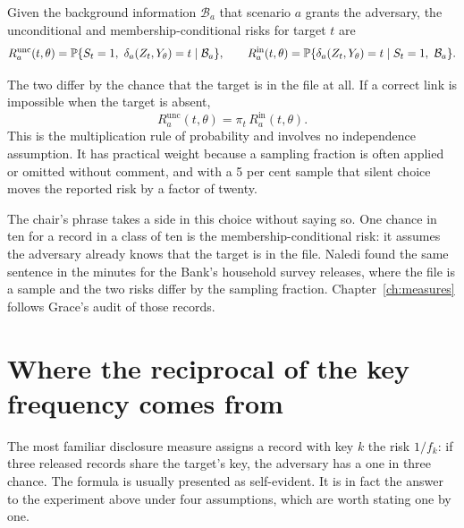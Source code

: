 \begin{definition}\label{def:risk}
Given the background information $\mathcal{B}_a$ that scenario $a$ grants the
adversary, the unconditional and membership-conditional risks for target $t$ are
\begin{equation}\label{eq:tworisks}
R^{\mathrm{unc}}_a(t,\theta) = \mathbb{P}\{S_t = 1,\ \delta_a(Z_t,Y_\theta) = t \mid \mathcal{B}_a\},
\qquad
R^{\mathrm{in}}_a(t,\theta) = \mathbb{P}\{\delta_a(Z_t,Y_\theta) = t \mid S_t = 1,\ \mathcal{B}_a\}.
\end{equation}
\end{definition}

The two differ by the chance that the target is in the file at all. If a correct
link is impossible when the target is absent,
\begin{equation}\label{eq:factor}
R^{\mathrm{unc}}_a(t,\theta) = \pi_t\, R^{\mathrm{in}}_a(t,\theta).
\end{equation}
This is the multiplication rule of probability and involves no independence
assumption. It has practical weight because a sampling fraction is often applied
or omitted without comment, and with a 5 per cent sample that silent choice moves
the reported risk by a factor of twenty.

The chair's phrase takes a side in this choice without saying so. One chance in ten for a record in a class of ten is the membership-conditional risk: it assumes the adversary already knows that the target is in the file. Naledi found the same sentence in the minutes for the Bank's household survey releases, where the file is a sample and the two risks differ by the sampling fraction. Chapter~\ref{ch:measures} follows Grace's audit of those records.

\section{Where the reciprocal of the key frequency comes from}

The most familiar disclosure measure assigns a record with key $k$ the risk
$1/f_k$: if three released records share the target's key, the adversary has a one
in three chance. The formula is usually presented as self-evident. It is in fact
the answer to the experiment above under four assumptions, which are worth stating
one by one.

